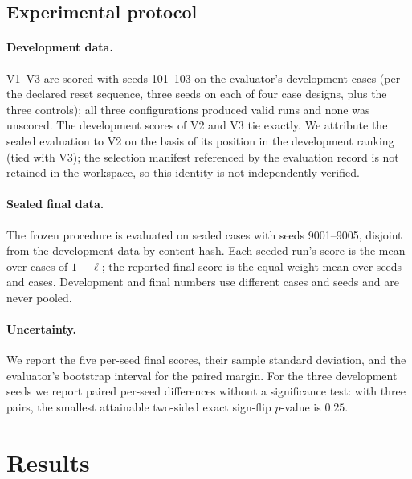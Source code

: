 \documentclass{article}
\begin{document}
\subsection{Experimental protocol}
\paragraph{Development data.} V1--V3 are scored with seeds 101--103 on the evaluator's development cases (per the declared reset sequence, three seeds on each of four case designs, plus the three controls); all three configurations produced valid runs and none was unscored. The development scores of V2 and V3 tie exactly. We attribute the sealed evaluation to V2 on the basis of its position in the development ranking (tied with V3); the selection manifest referenced by the evaluation record is not retained in the workspace, so this identity is not independently verified.
\paragraph{Sealed final data.} The frozen procedure is evaluated on sealed cases with seeds 9001--9005, disjoint from the development data by content hash. Each seeded run's score is the mean over cases of $1-\ell$; the reported final score is the equal-weight mean over seeds and cases. Development and final numbers use different cases and seeds and are never pooled.
\paragraph{Uncertainty.} We report the five per-seed final scores, their sample standard deviation, and the evaluator's bootstrap interval for the paired margin. For the three development seeds we report paired per-seed differences without a significance test: with three pairs, the smallest attainable two-sided exact sign-flip $p$-value is $0.25$.

\section{Results}\label{sec:results}
\end{document}
